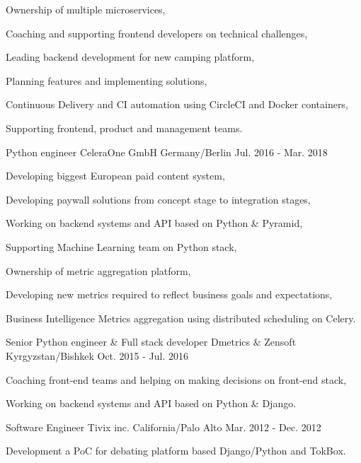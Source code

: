 \begin{cventries}
{\begin{cvitems}
        \item {Ownership of multiple microservices,}
        \item {Coaching and supporting frontend developers on technical challenges,}
        \item {Leading backend development for new camping platform,}
        \item {Planning features and implementing solutions,}
        \item {Continuous Delivery and CI automation using CircleCI and Docker containers,}
        \item {Supporting frontend, product and management teams.}
      \end{cvitems}
    }
  \cventry
    {Python engineer}
    {CeleraOne GmbH}
    {Germany/Berlin}
    {Jul. 2016 - Mar. 2018}
    {
      \begin{cvitems}
        \item {Developing biggest European paid content system,}
        \item {Developing paywall solutions from concept stage to integration stages,}
        \item {Working on backend systems and API based on Python \& Pyramid,}
        \item {Supporting Machine Learning team on Python stack,}
        \item {Ownership of metric aggregation platform,}
        \item {Developing new metrics required to reflect business goals and expectations,}
        \item {Business Intelligence Metrics aggregation using distributed scheduling on Celery.}
      \end{cvitems}
    }
  \cventry
    {Senior Python engineer \& Full stack developer}
    {Dmetrics \& Zensoft}
    {Kyrgyzstan/Bishkek}
    {Oct. 2015 - Jul. 2016}
    {
      \begin{cvitems}
        \item {Coaching front-end teams and helping on making decisions on front-end stack,}
        \item {Working on backend systems and API based on Python \& Django.}
      \end{cvitems}
    }
  \cventry
    {Software Engineer}
    {Tivix inc.}
    {California/Palo Alto}
    {Mar. 2012 - Dec. 2012}
    {
      \begin{cvitems}
        \item {Development a PoC for debating platform based Django/Python and TokBox.}

\end{cvitems}}
\end{cventries}
